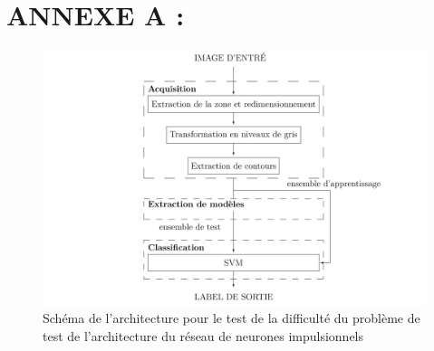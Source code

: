 \documentclass[12pt]{article}
\begin{document}
\section*{ANNEXE A :}
\begin{figure}[h!]
\includegraphics[scale=0.3]{data/svm.png}
\caption{Schéma de l'architecture pour le test de la difficulté du problème de test de l'architecture du réseau de neurones impulsionnels}
\label{svm}
\end{figure}
    
    


\end{document}
